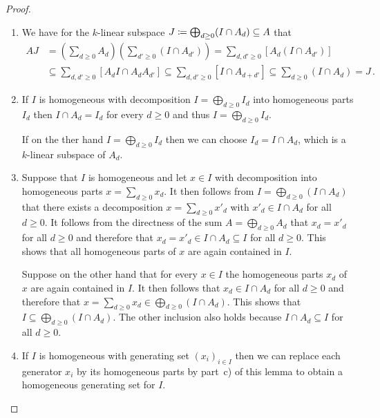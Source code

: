 \begin{proof}
  \leavevmode
  \begin{enumerate}
    \item
      We have for the $k$-linear subspace $J \coloneqq \bigoplus_{d \geq 0} (I \cap A_d) \subseteq A$ that
      \begin{align*}
                    A J
        &=          \left( \sum_{d \geq 0} A_d \right)\left( \sum_{d' \geq 0} (I \cap A_{d'}) \right)
         =          \sum_{d, d' \geq 0} [ A_d (I \cap A_{d'}) ] \\
        &\subseteq  \sum_{d, d' \geq 0} [ A_d I \cap A_d A_{d'} ]
         \subseteq  \sum_{d, d' \geq 0} [ I \cap A_{d+d'} ]
         \subseteq  \sum_{d \geq 0} (I \cap A_d)
         =          J \,.
      \end{align*}
    \item
      If $I$ is homogeneous with decomposition $I = \bigoplus_{d \geq 0} I_d$ into homogeneous parts $I_d$ then $I \cap A_d = I_d$ for every $d \geq 0$ and thus $I = \bigoplus_{d \geq 0} I_d$.
      
      If on the ther hand $I = \bigoplus_{d \geq 0} I_d$ then we can choose $I_d = I \cap A_d$, which is a $k$-linear subspace of $A_d$.
    \item
      Suppose that $I$ is homogeneous and let $x \in I$ with decomposition into homogeneous parts $x = \sum_{d \geq 0} x_d$.
      It then follows from $I = \bigoplus_{d \geq 0} (I \cap A_d)$ that there exists a decomposition $x = \sum_{d \geq 0} x'_d$ with $x'_d \in I \cap A_d$ for all $d \geq 0$.
      It follows from the directness of the sum $A = \bigoplus_{d \geq 0} A_d$ that $x_d = x'_d$ for all $d \geq 0$ and therefore that $x_d = x'_d \in I \cap A_d \subseteq I$ for all $d \geq 0$.
      This shows that all homogeneous parts of $x$ are again contained in $I$.
      
      Suppose on the other hand that for every $x \in I$ the homogeneous parts $x_d$ of $x$ are again contained in $I$.
      It then follows that $x_d \in I \cap A_d$ for all $d \geq 0$ and therefore that $x = \sum_{d \geq 0} x_d \in \bigoplus_{d \geq 0} (I \cap A_d)$.
      This shows that $I \subseteq \bigoplus_{d \geq 0} (I \cap A_d)$.
      The other inclusion also holds because $I \cap A_d \subseteq I$ for all $d \geq 0$.
    \item
      If $I$ is homogeneous with generating set $(x_i)_{i \in I}$ then we can replace each generator $x_i$ by its homogeneous parts by part~c) of this lemma to obtain a homogeneous generating set for $I$.
      

\end{enumerate}
\end{proof}
